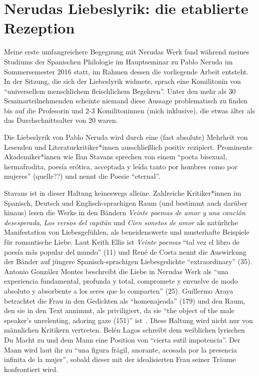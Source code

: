 \section{Nerudas Liebeslyrik: die etablierte Rezeption}

Meine erste umfangreichere Begegnung mit Nerudas Werk fand während meines Studiums der Spanischen Philologie im Hauptseminar zu Pablo Neruda im Sommersemester 2016 statt, im Rahmen dessen die vorliegende Arbeit entsteht.
In der Sitzung, die sich der Liebeslyrik widmete, sprach eine Komilitonin von ``universellem menschlichem fleischlichem Begehren''.
Unter den mehr als 30 Seminarteilnehmenden scheinte niemand diese Aussage problematisch zu finden bis auf die Profesorin und 2-3 Komilitoninnen (mich inklusive), die etwas älter als das Durchschnittsalter von 20 waren.

Die Liebeslyrik von Pablo Neruda wird durch eine (fast absolute) Mehrheit von Lesenden und Literaturkritiker*innen ausschließlich positiv rezipiert.
Prominente Akademiker*innen wie Ilan Stavans sprechen von einem ``poeta bisexual, hermafrodita, poesía erótica, acceptada y leída tanto por hombres como por mujeres'' (quelle??)
und nennt die Poesie ``eternal''\cite{Stavans2014}.

Stavans ist in dieser Haltung keineswegs alleine.
Zahlreiche Kritiker*innen im Spanisch, Deutsch und Englisch-sprachigen Raum (und bestimmt auch darüber hinaus) lesen die Werke in den Bändern \textit{Veinte poemas de amor y una canción desesperada}, \textit{Los versos del capitán} und \textit{Cien sonetos de amor} als natürliche Manifestation von Liebesgefühlen, als beneidenswerte und musterhafte Beispiele für romantische Liebe.
Laut Keith Ellis ist \textit{Veinte poemas} ``tal vez el libro de poesía más popular del mundo'' (11)
und René de Costa nennt die Auswirkung der Bänder auf jüngere Spanisch-sprachigen Liebesgedichte ``extraordinary'' (35). %
Antonio González Montes beschreibt die Liebe in Nerudas Werk als ``una experiencia fundamental, profunda y total, compromete y envuelve de modo absoluto y absorbente a los seres que lo comparten'' (25).
Guillermo Araya betrachtet die Frau in den Gedichten als ``homenajeada'' (179) und den Raum, den sie in den Text annimmt, als priviligiert, da sie ``the object of the male speaker's unrelenting, adoring gaze (151)'' ist~\cite{Duncan1992}.
Diese Haltung wird nicht nur von männlichen Kritikern vertreten.
Belén Lagos schreibt dem weiblichen lyrischen Du Macht zu und dem Mann eine Position von ``cierta sutil impotencia''.
Der Mann wird laut ihr zu ``una figura frágil, anorante, acosada por la presencia infinita de la mujer'', sobald dieser mit der idealisierten Frau seiner Träume konfrontiert wird.

